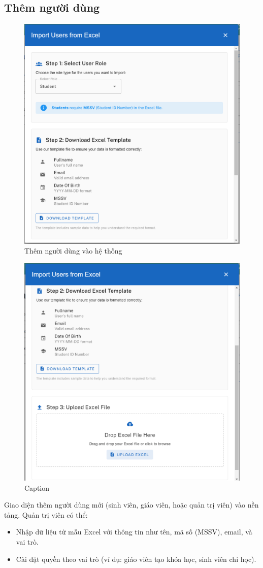 \subsection{Thêm người dùng}
\begin{figure}[H]
    \centering
    \includegraphics[width=0.6\linewidth]{images/admin_add_user_1.png}
    \caption{Thêm người dùng vào hệ thống }
    \label{fig:enter-label}
\end{figure}
\begin{figure}[H]
    \centering
    \includegraphics[width=0.6\linewidth]{images/admin_add_user_2.png}
    \caption{Caption}
    \label{fig:enter-label}
\end{figure}
Giao diện thêm người dùng mới (sinh viên, giáo viên, hoặc quản trị viên) vào nền tảng. Quản trị viên có thể:
\begin{itemize}
    \item Nhập dữ liệu từ mẫu Excel với thông tin như tên, mã số (MSSV), email, và vai trò.
    \item Cài đặt quyền theo vai trò (ví dụ: giáo viên tạo khóa học, sinh viên chỉ học).
\end{itemize}
